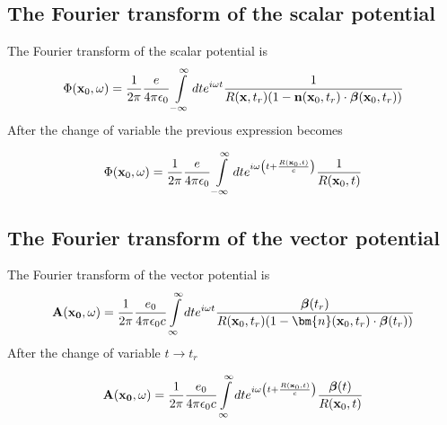 \subsection{The Fourier transform of the scalar potential}
The Fourier transform of the scalar potential is
\begin{align}
    \Phi({\bf x}_0,\omega)=\frac1{2\pi}\frac{e}{4\pi\epsilon_0}\int\limits_{-\infty}^{\infty}dte^{i\omega t}\frac{1}{R({\bf x},t_r)(1-{\bf n}({\bf x}_0,t_r)\cdot{\boldsymbol{\beta}}({\bf x}_0,t_r))}\label{tranf_pot_scalar}
\end{align}
After the change of variable the previous expression becomes
\begin{tcolorbox}[colback=blue!5!white,colframe=blue!75!black]
    \begin{align}
        \Phi({\bf x}_0,\omega)=\frac1{2\pi}\frac{e}{4\pi\epsilon_0}\int\limits_{-\infty}^{\infty}dte^{i\omega \left(t+\frac{R({\bf x}_0,t)}c\right)}\frac{1}{R({\bf x}_0,t)}\label{tranf_pot}
    \end{align}
\end{tcolorbox}

\subsection{The Fourier transform of the vector potential}
The Fourier transform of the vector potential is
\begin{align}
    {\bf A}({\bf x_0},\omega)=\frac1{2\pi}\frac{e_0}{4\pi\epsilon_0c}\int\limits_{\infty}^{\infty}dte^{i\omega t}\frac{{\boldsymbol{\beta}}(t_r)}{R({\bf x}_0,t_r)(1-{\bm{n}}({\bf x}_0,t_r)\cdot{\boldsymbol{\beta}}(t_r))}\label{tranf_A_vector}
\end{align}
After the change of variable  $t\rightarrow t_r$
\begin{tcolorbox}[colback=blue!5!white,colframe=blue!75!black]
    \begin{align}
        {\bf A}({\bf x_0},\omega)=\frac1{2\pi}\frac{e_0}{4\pi\epsilon_0c}\int\limits_{\infty}^{\infty}dte^{i\omega \left(t+\frac{R({\bf x}_0,t)}c\right)}\frac{{\boldsymbol{\beta}}(t)}{R({\bf x}_0,t)}\label{tranf_A}
    \end{align}
\end{tcolorbox}


